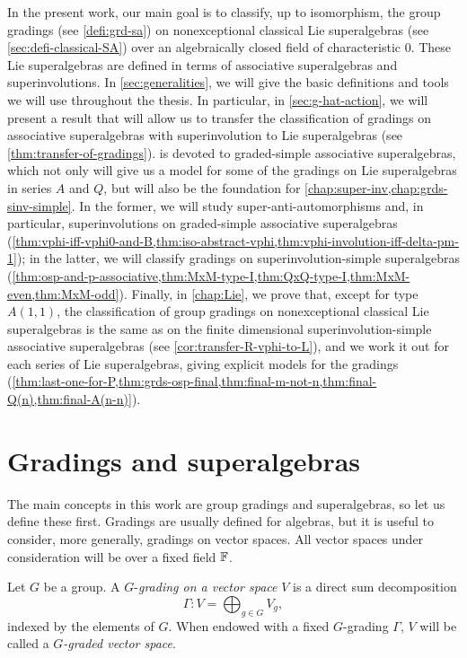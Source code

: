 In the present work, our main goal is to classify, up to isomorphism, the group gradings (see \cref{defi:grd-sa}) on nonexceptional classical Lie superalgebras (see \cref{sec:defi-classical-SA}) over an algebraically closed field of characteristic $0$. 
These Lie superalgebras are defined in terms of associative superalgebras and  superinvolutions. 
In \cref{sec:generalities}, we will give the basic definitions and tools we will use throughout the thesis. 
In particular, in \cref{sec:g-hat-action}, we will present a result that will allow us to transfer the classification of gradings on associative superalgebras with superinvolution to Lie superalgebras (see \cref{thm:transfer-of-gradings}). 
 is devoted to graded-simple associative superalgebras, which not only will give us a model for some of the gradings on Lie superalgebras in series $A$ and $Q$, but will also be the foundation for \cref{chap:super-inv,chap:grds-sinv-simple}. 
In the former, we will study super-anti-automorphisms and, in particular, superinvolutions on graded-simple associative superalgebras (\cref{thm:vphi-iff-vphi0-and-B,thm:iso-abstract-vphi,thm:vphi-involution-iff-delta-pm-1}); in the latter, we will classify gradings on superinvolution-simple superalgebras (\cref{thm:osp-and-p-associative,thm:MxM-type-I,thm:QxQ-type-I,thm:MxM-even,thm:MxM-odd}).  
Finally, in \cref{chap:Lie}, we prove that, except for type $A(1,1)$, the classification of group gradings on nonexceptional classical Lie superalgebras is the same as on the finite dimensional superinvolution-simple associative superalgebras (see \cref{cor:transfer-R-vphi-to-L}), and we work it out for each series of Lie superalgebras, giving explicit models for the gradings (\cref{thm:last-one-for-P,thm:grds-osp-final,thm:final-m-not-n,thm:final-Q(n),thm:final-A(n-n)}).


\section{Gradings and superalgebras}\label{sec:grds-and-sa}

The main concepts in this work are group gradings and superalgebras, so let us define these first.
Gradings are usually defined for algebras, but it is useful to consider, more generally, gradings on vector spaces. 
All vector spaces under consideration will be over a fixed field $\mathbb{F}$. 

\begin{defi}\label{defi:grading}
    Let $G$ be a group. 
	A $G$-\emph{grading on a vector space} $V$ is a direct sum decomposition
	\[\label{eq:grading}
	    \Gamma : V= \bigoplus_{g \in G} V_g,
	\]
	indexed by the elements of $G$.
	When endowed with a fixed $G$-grading $\Gamma$, $V$ will be called a \emph{$G$-graded vector space}. 
\end{defi}


